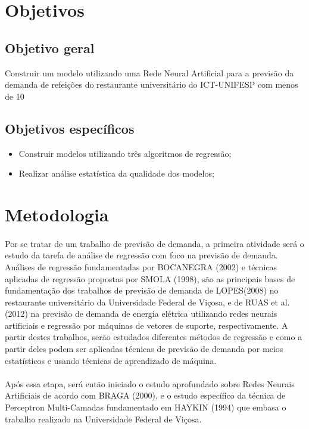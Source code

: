 \documentclass[	12pt, Times, openright, twoside, a4paper, english, brazil]{abntex2}
\begin{document}
\section{Objetivos}
\subsection{Objetivo geral}
Construir um modelo utilizando uma Rede Neural Artificial para a previsão da demanda de
refeições do restaurante universitário do ICT-UNIFESP com menos de 10%
\subsection{Objetivos específicos}
\begin{itemize}
\item Construir modelos utilizando três algoritmos de regressão; 
\item Realizar análise estatística da qualidade dos modelos;
\end{itemize}

\section{Metodologia}
\paragraph*{} Por se tratar de um trabalho de previsão de demanda, a primeira atividade será o estudo da tarefa de análise de regressão com foco na previsão de demanda. Análises de regressão fundamentadas por BOCANEGRA (2002) e técnicas aplicadas de regressão propostas por SMOLA (1998), são as principais bases de fundamentação dos trabalhos de previsão de demanda de LOPES(2008) no restaurante universitário da Universidade Federal de Viçosa, e de RUAS et al. (2012) na previsão de demanda de energia elétrica utilizando redes neurais artificiais e regressão por máquinas de vetores de suporte, respectivamente. A partir destes trabalhos, serão estudados diferentes métodos de regressão e como a partir deles podem ser aplicadas técnicas de previsão de demanda por meios estatísticos e usando técnicas de aprendizado de máquina.

\paragraph*{}
Após essa etapa, será então iniciado o estudo aprofundado sobre Redes Neurais Artificiais de acordo com BRAGA (2000), e o estudo específico da técnica de Perceptron Multi-Camadas fundamentado em HAYKIN (1994) que embasa o trabalho realizado na Universidade Federal de Viçosa.
\end{document}
